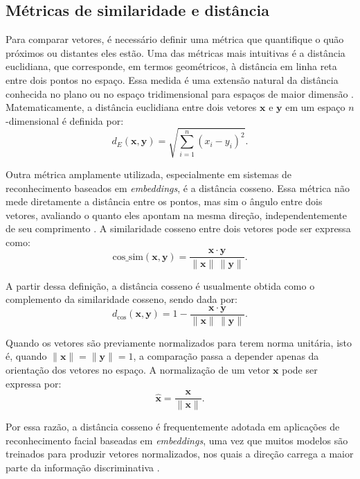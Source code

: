\subsection{Métricas de similaridade e distância}

Para comparar vetores, é necessário definir uma métrica que quantifique o quão próximos ou distantes eles estão. Uma das métricas mais intuitivas é a distância euclidiana, que corresponde, em termos geométricos, à distância em linha reta entre dois pontos no espaço. Essa medida é uma extensão natural da distância conhecida no plano ou no espaço tridimensional para espaços de maior dimensão \cite{bishop2006prml}. Matematicamente, a distância euclidiana entre dois vetores $\mathbf{x}$ e $\mathbf{y}$ em um espaço $n$-dimensional é definida por:
\begin{equation}
d_{E}(\mathbf{x}, \mathbf{y}) = \sqrt{\sum_{i=1}^{n} (x_i - y_i)^2}.
\end{equation}

Outra métrica amplamente utilizada, especialmente em sistemas de reconhecimento baseados em \textit{embeddings}, é a distância cosseno. Essa métrica não mede diretamente a distância entre os pontos, mas sim o ângulo entre dois vetores, avaliando o quanto eles apontam na mesma direção, independentemente de seu comprimento \cite{schroff2015facenet}. A similaridade cosseno entre dois vetores pode ser expressa como:
\begin{equation}
\text{cos\_sim}(\mathbf{x}, \mathbf{y}) = \frac{\mathbf{x} \cdot \mathbf{y}}{\|\mathbf{x}\| \, \|\mathbf{y}\|}.
\end{equation}

A partir dessa definição, a distância cosseno é usualmente obtida como o complemento da similaridade cosseno, sendo dada por:
\begin{equation}
d_{\cos}(\mathbf{x}, \mathbf{y}) = 1 - \frac{\mathbf{x} \cdot \mathbf{y}}{\|\mathbf{x}\| \, \|\mathbf{y}\|}.
\end{equation}

Quando os vetores são previamente normalizados para terem norma unitária, isto é, quando $\|\mathbf{x}\| = \|\mathbf{y}\| = 1$, a comparação passa a depender apenas da orientação dos vetores no espaço. A normalização de um vetor $\mathbf{x}$ pode ser expressa por:
\begin{equation}
\hat{\mathbf{x}} = \frac{\mathbf{x}}{\|\mathbf{x}\|}.
\end{equation}

Por essa razão, a distância cosseno é frequentemente adotada em aplicações de reconhecimento facial baseadas em \textit{embeddings}, uma vez que muitos modelos são treinados para produzir vetores normalizados, nos quais a direção carrega a maior parte da informação discriminativa \cite{schroff2015facenet}.


